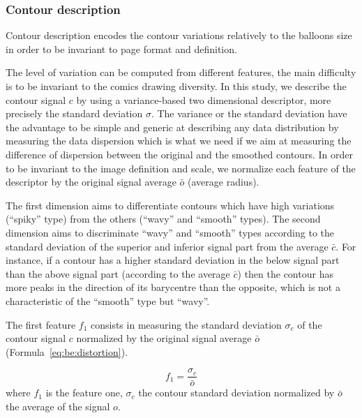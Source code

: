 \subsubsection{Contour description}
\label{sec:be:description}

Contour description encodes the contour variations relatively to the balloons size in order to be invariant to page format and definition.

The level of variation can be computed from different features, the main difficulty is to be invariant to the comics drawing diversity. 
In this study, we describe the contour signal $c$ by using a variance-based two dimensional descriptor, more precisely the standard deviation $\sigma$. The variance or the standard deviation have the advantage to be simple and generic at describing any data distribution by measuring the data dispersion which is what we need if we aim at measuring the difference of dispersion between the original and the smoothed contours. In order to be invariant to the image definition and scale, we normalize each feature of the descriptor by the original signal average $\bar{o}$ (average radius).

The first dimension aims to differentiate contours which have high variations (``spiky'' type) from the others (``wavy'' and ``smooth'' types). The second dimension aims to discriminate ``wavy'' and ``smooth'' types according to the standard deviation of the superior and inferior signal part from the average $\bar{c}$. For instance, if a contour has a higher standard deviation in the below signal part than the above signal part (according to the average $\bar{c}$) then the contour has more peaks in the direction of its barycentre than the opposite, which is not a characteristic of the ``smooth'' type but ``wavy''.

The first feature $f_1$ consists in measuring the standard deviation $\sigma_c$ of the contour signal $c$ normalized by the original signal average $\bar{o}$ (Formula~\ref{eq:be:distortion}).


\begin{equation}\label{eq:be:distortion}
 f_1 = \frac{\sigma_c}{\bar{o}}%
\end{equation}
where $f_1$ is the feature one, $\sigma_c$ the contour standard deviation normalized by $\bar{o}$ the average of the signal $o$. 


